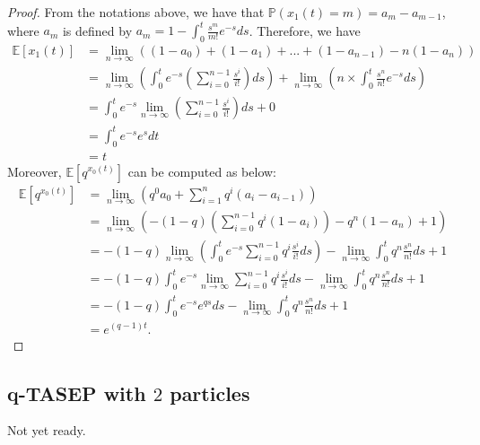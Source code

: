 \begin{proof}
From the notations above, we have that $\mathbb{P}(x_1(t) = m) = a_m - a_{m-1}$, where $a_m$ is defined by $a_m = 1 - \int_0^t \frac{s^m}{m!} e^{-s} ds$. Therefore, we have
\begin{align}
\mathbb{E}[x_1(t)] &=  \lim_{n \to \infty} ((1-a_0) + (1-a_1) + ... + (1-a_{n-1}) - n ( 1-a_n))\\
  						&= \lim_{n \to \infty} (\int_{0}^{t} e^{-s}  (\sum_{i=0}^{n-1} \frac{s^i}{i!}) ds) +\lim_{n \to \infty} (n \times \int_{0}^{t} \frac{s^n}{n!} e^{-s} ds)\\
						&=  \int_{0}^{t} e^{-s} \lim_{n \to \infty} (\sum_{i=0}^{n-1} \frac{s^i}{i!}) ds + 0\\
						&=  \int_{0}^{t} e^{-s} e^s dt\\
						&= t
\end{align}
Moreover, $\mathbb{E}[q^{x_0(t)}]$ can be computed as below: 
\begin{align}
\mathbb{E}[q^{x_0(t)}] &= \lim_{n \to \infty} (q^0  a_0 + \sum_{i=1}^{n} q^i (a_i - a_{i-1}) )\\
											 &= \lim_{n \to \infty} (-(1-q) (\sum_{i=0}^{n-1} q^i (1-a_i)) - q^n (1-a_n) + 1)\\
											 &= - (1-q) \lim_{n \to \infty} ( \int_{0}^{t} e^{-s} \sum_{i=0}^{n-1} q^i \frac{s^i}{i!} ds) - \lim_{n \to \infty} \int_0^t q^n \frac{s^n}{n!} ds + 1\\
											 &=  - (1-q) \int_0^t e^{-s }  \lim_{n \to \infty} \sum_{i=0}^{n-1} q^i \frac{s^i}{i!} ds- \lim_{n \to \infty} \int_0^t q^n \frac{s^n}{n!} ds + 1\\
				     					 &=  - (1-q) \int_0^t e^{-s } e^{qs}  ds -\lim_{n \to \infty}  \int_0^t q^n \frac{s^n}{n!} ds + 1\\
				     					 &= e^{(q-1)t}.
\end{align}
\end{proof}

\subsection{q-TASEP with $2$ particles}
Not yet ready. 

